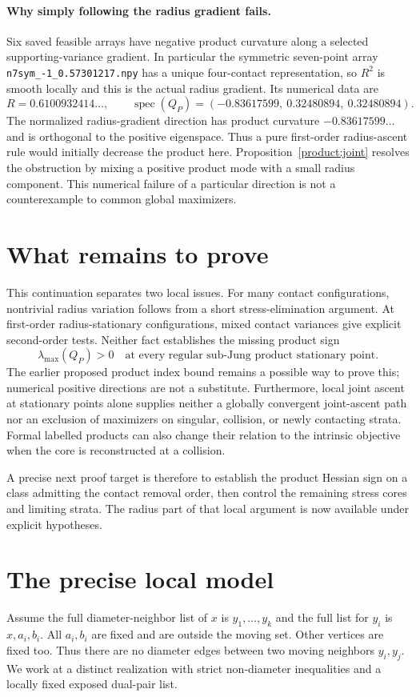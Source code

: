 \documentclass[11pt]{article}
\theoremstyle{remark}\newtheorem{remark}[theorem]{Remark}
\begin{document}
\paragraph{Why simply following the radius gradient fails.}
Six saved feasible arrays have negative product curvature along a
selected supporting-variance gradient. In particular the symmetric
seven-point array \texttt{n7sym\_-1\_0.57301217.npy} has a unique
four-contact representation, so $R^2$ is smooth locally and this is
the actual radius gradient. Its numerical data are
\[
 R=0.6100932414\ldots,\qquad
 \operatorname{spec}(Q_P)=
 (-0.83617599,\ 0.32480894,\ 0.32480894).
\]
The normalized radius-gradient direction has product curvature
$-0.83617599\ldots$ and is orthogonal to the positive eigenspace.
Thus a pure first-order radius-ascent rule would initially decrease
the product here. Proposition~\ref{product:joint} resolves the obstruction
by mixing a positive product mode with a small radius component.
This numerical failure of a particular direction is not a
counterexample to common global maximizers.

\section{What remains to prove}
This continuation separates two local issues. For many contact
configurations, nontrivial radius variation follows from a short
stress-elimination argument. At first-order radius-stationary
configurations, mixed contact variances give explicit second-order
tests. Neither fact establishes the missing product sign
\[
 \lambda_{\max}(Q_P)>0
 \quad\text{at every regular sub-Jung product stationary point.}
\]
The earlier proposed product index bound remains a possible way to
prove this; numerical positive directions are not a substitute.
Furthermore, local joint ascent at stationary points alone supplies
neither a globally convergent joint-ascent path nor an exclusion of
maximizers on singular, collision, or newly contacting strata.
Formal labelled products can also change their relation to the
intrinsic objective when the core is reconstructed at a collision.

A precise next proof target is therefore to establish the product
Hessian sign on a class admitting the contact removal order, then
control the remaining stress cores and limiting strata. The radius
part of that local argument is now available under explicit hypotheses.


\section{The precise local model}
Assume the full diameter-neighbor list of $x$ is $y_1,\ldots,y_k$ and
the full list for $y_i$ is $x,a_i,b_i$. All $a_i,b_i$ are fixed and
are outside the moving set. Other vertices are fixed too. Thus there
are no diameter edges between two moving neighbors $y_i,y_j$.
We work at a distinct realization with strict non-diameter inequalities
and a locally fixed exposed dual-pair list.
\end{document}
